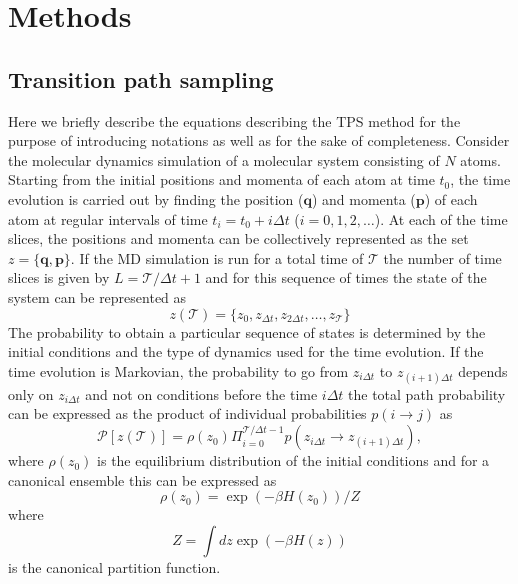 \documentclass[journal=jpcbfk,manuscript=article,layout=traditional]{achemso}
\begin{document}
\section{Methods}
\subsection{Transition path sampling}
Here we briefly describe the equations describing the TPS method for the purpose of
introducing notations as well as for the sake of completeness. 
Consider the molecular dynamics simulation of a molecular system consisting 
of $N$ atoms. Starting from the initial positions and momenta of each atom at time $t_0$,
the time evolution is carried out by finding the position ($\textbf{q}$) and 
momenta ($\textbf{p}$) of each atom at regular intervals of time $t_i = t_0 + i\Delta t$  
($i = 0,1,2,\ldots$). At each of the time slices, the positions and 
momenta can be collectively represented as
the set $z = \{\textbf{q},\textbf{p}\}$. If the MD simulation is 
run for a total 
time of $\mathcal{T}$ the number of time slices is given by 
$L = \mathcal{T}/\Delta t +1$ and for this sequence of 
times the state of the system can be represented as 
\begin{equation}
z(\mathcal{T}) = \{z_0, z_{\Delta t}, z_{2\Delta t},\ldots,z_{\mathcal{T}}\}
\end{equation}
The probability to obtain a particular sequence of states is determined by the initial 
conditions and the type of dynamics used for the time evolution. If the time evolution is 
Markovian, the probability to go from $z_{i\Delta t}$ to $z_{(i+1)\Delta t}$ depends only 
on $z_{i\Delta t}$ and not on conditions before the time $i\Delta t$ the total path probability can 
be expressed as the product of individual probabilities $p(i\rightarrow j)$ as 
\begin{equation}
\mathcal{P}[z(\mathcal{T})] = \rho(z_0)\Pi_{i=0}^{\mathcal{T}/\Delta t-1} p(z_{i\Delta t}\rightarrow z_{(i+1)\Delta t}),
\end{equation}
where $\rho(z_0)$ is the equilibrium distribution of the initial conditions and for a canonical ensemble this can be 
expressed as 
\begin{equation}
\rho(z_0) = \exp(-\beta H(z_0))/Z
\end{equation}
where 
\begin{equation}
Z = \int dz \exp(-\beta H(z)) 
\end{equation}
is the canonical partition function. 
\end{document}
